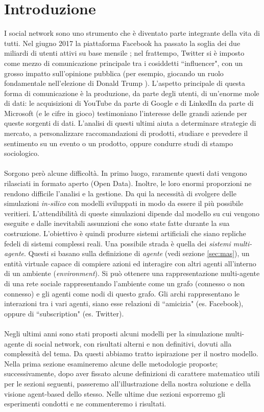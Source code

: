 \documentclass[a4paper,12pt]{article}
\begin{document}
\newpage
\tableofcontents
\newpage
\section{Introduzione}
\label{sec:introduction}

I social network sono uno strumento che è diventato parte integrante della vita di tutti. Nel giugno 2017 la piattaforma Facebook ha passato la soglia dei due miliardi di utenti attivi su base mensile \cite{facebook}; nel frattempo, Twitter si è imposto come mezzo di comunicazione principale tra i cosiddetti ``influencer", con un grosso impatto sull'opinione pubblica (per esempio, giocando un ruolo fondamentale nell'elezione di Donald Trump \cite{twitter}). L'aspetto principale di questa forma di comunicazione è la produzione, da parte degli utenti, di un'enorme mole di dati: le acquisizioni di YouTube da parte di Google \cite{youtube} e di LinkedIn da parte di Microsoft \cite{linkedin} (e le cifre in gioco) testimoniano l'interesse delle grandi aziende per queste sorgenti di dati. L'analisi di questi ultimi aiuta a determinare strategie di mercato, a personalizzare raccomandazioni di prodotti, studiare e prevedere il sentimento su un evento o un prodotto, oppure condurre studi di stampo sociologico. 
\\
\\
Sorgono però alcune difficoltà. In primo luogo, raramente questi dati vengono rilasciati in formato aperto (Open Data). Inoltre, le loro enormi proporzioni ne rendono difficile l'analisi e la gestione. Da qui la necessità di svolgere delle simulazioni \textit{in-silico} con modelli sviluppati in modo da essere il più possibile veritieri. L'attendibilità di queste simulazioni dipende dal modello su cui vengono eseguite e dalle inevitabili assunzioni che sono state fatte durante la sua costruzione. L'obiettivo è quindi produrre sistemi artificiali che siano repliche fedeli di sistemi complessi reali. Una possibile strada è quella dei \textit{sistemi multi-agente}. Questi si basano sulla definizione di \textit{agente} (vedi sezione \ref{sec:mas}), un entità virtuale \cite{ferber} capace di compiere azioni ed interagire con altri agenti all'interno di un ambiente (\textit{environment}). Si può ottenere una rappresentazione multi-agente di una rete sociale rappresentando l'ambiente come un grafo (connesso o non connesso) e gli agenti come nodi di questo grafo. Gli archi rappresentano le interazioni tra i vari agenti, siano esse relazioni di ``amicizia" (es. Facebook), oppure di ``subscription" (es. Twitter).
\\
\\
Negli ultimi anni sono stati proposti alcuni modelli per la simulazione multi-agente di social network, con risultati alterni e non definitivi, dovuti alla complessità del tema. Da questi abbiamo tratto ispirazione per il nostro modello. Nella prima sezione esamineremo alcune delle metodologie proposte; successivamente, dopo aver fissato alcune definizioni di carattere matematico utili per le sezioni seguenti, passeremo all'illustrazione della nostra soluzione e della visione agent-based dello stesso. Nelle ultime due sezioni esporremo gli esperimenti condotti e ne commenteremo i risultati.
\newpage
\end{document}
